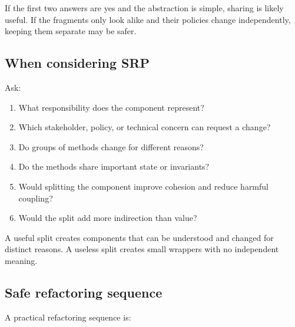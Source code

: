 \documentclass[12pt,a4paper]{article}
\begin{document}
If the first two answers are yes and the abstraction is simple, sharing is likely useful. If the fragments only look alike and their policies change independently, keeping them separate may be safer.

\subsection{When considering SRP}

Ask:

\begin{enumerate}

\item What responsibility does the component represent?

\item Which stakeholder, policy, or technical concern can request a change?

\item Do groups of methods change for different reasons?

\item Do the methods share important state or invariants?

\item Would splitting the component improve cohesion and reduce harmful coupling?

\item Would the split add more indirection than value?

\end{enumerate}

A useful split creates components that can be understood and changed for distinct reasons. A useless split creates small wrappers with no independent meaning.

\subsection{Safe refactoring sequence}

A practical refactoring sequence is:
\end{document}
